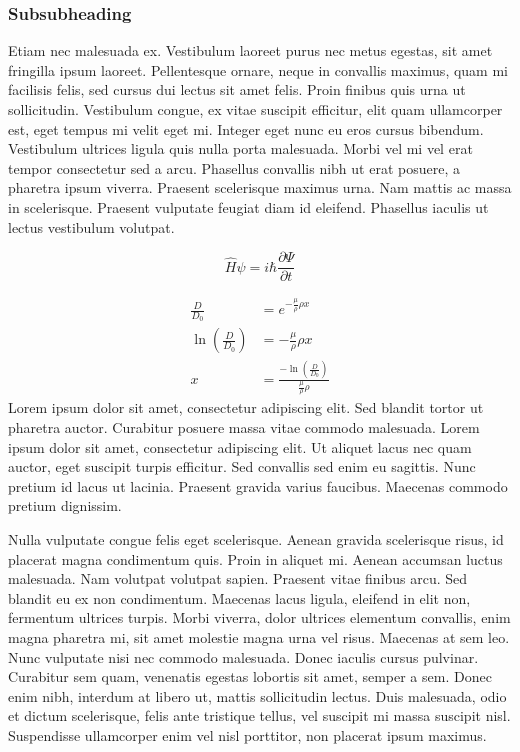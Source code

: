 \documentclass[12pt]{article}
\begin{document}
\subsubsection*{Subsubheading}
Etiam nec malesuada ex. Vestibulum laoreet purus nec metus egestas, sit amet fringilla ipsum laoreet. Pellentesque ornare, neque in convallis maximus, quam mi facilisis felis, sed cursus dui lectus sit amet felis. Proin finibus quis urna ut sollicitudin. Vestibulum congue, ex vitae suscipit efficitur, elit quam ullamcorper est, eget tempus mi velit eget mi. Integer eget nunc eu eros cursus bibendum. Vestibulum ultrices ligula quis nulla porta malesuada. Morbi vel mi vel erat tempor consectetur sed a arcu. Phasellus convallis nibh ut erat posuere, a pharetra ipsum viverra. Praesent scelerisque maximus urna. Nam mattis ac massa in scelerisque. Praesent vulputate feugiat diam id eleifend. Phasellus iaculis ut lectus vestibulum volutpat.

\begin{equation} %
     \hat{H} \psi = i \hbar \frac{\partial \Psi}{\partial t}
\end{equation}

\begin{align} %
     \frac{D}{D_0} &= e^{-\frac{\mu}{\rho}\rho x} \\
    \ln\left(\frac{D}{D_0}\right) &= -\frac{\mu}{\rho}\rho x \\
    x &= \frac{-\ln\left(\frac{D}{D_0}\right)}{\frac{\mu}{\rho}\rho}
\end{align}
Lorem ipsum dolor sit amet, consectetur adipiscing elit. Sed blandit tortor ut pharetra auctor. Curabitur posuere massa vitae commodo malesuada. Lorem ipsum dolor sit amet, consectetur adipiscing elit. Ut aliquet lacus nec quam auctor, eget suscipit turpis efficitur. Sed convallis sed enim eu sagittis. Nunc pretium id lacus ut lacinia. Praesent gravida varius faucibus. Maecenas commodo pretium dignissim.

Nulla vulputate congue felis eget scelerisque. Aenean gravida scelerisque risus, id placerat magna condimentum quis. Proin in aliquet mi. Aenean accumsan luctus malesuada. Nam volutpat volutpat sapien. Praesent vitae finibus arcu. Sed blandit eu ex non condimentum. Maecenas lacus ligula, eleifend in elit non, fermentum ultrices turpis. Morbi viverra, dolor ultrices elementum convallis, enim magna pharetra mi, sit amet molestie magna urna vel risus. Maecenas at sem leo. Nunc vulputate nisi nec commodo malesuada. Donec iaculis cursus pulvinar. Curabitur sem quam, venenatis egestas lobortis sit amet, semper a sem. Donec enim nibh, interdum at libero ut, mattis sollicitudin lectus. Duis malesuada, odio et dictum scelerisque, felis ante tristique tellus, vel suscipit mi massa suscipit nisl. Suspendisse ullamcorper enim vel nisl porttitor, non placerat ipsum maximus.
\end{document}
